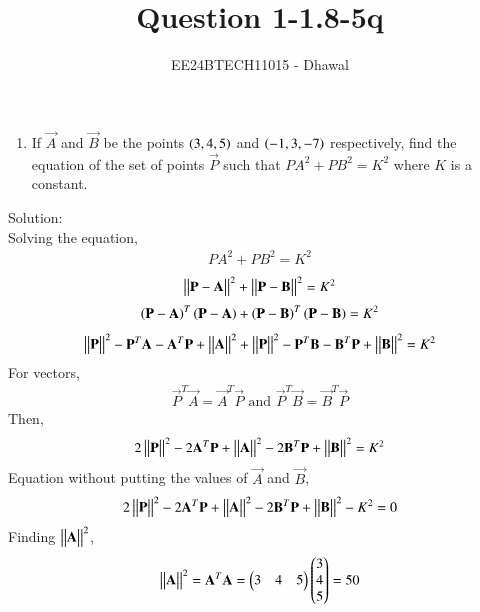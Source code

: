 \documentclass[journal]{IEEEtran}
\numberwithin{equation}{enumi}
\numberwithin{figure}{enumi}
\begin{document}

\title{Question 1-1.8-5q}
\author{EE24BTECH11015 - Dhawal}
{\let\newpage\relax\maketitle}
\begin{enumerate}
	\item If $\vec{A}$ and $\vec{B}$ be the points $\left(3,4,5\right)$ and $\left(-1,3,-7\right)$ respectively, find the equation of the set of points $\vec{P}$ such that ${PA}^2+{PB}^2=K^2$ where $K$ is a constant.
\end{enumerate}
Solution:\\
Solving the equation,
\begin{align}
        {PA}^2+{PB}^2=K^2
        \end{align}
        \begin{align}
        \begin{vmatrix}\begin{vmatrix}\mathbf{P}-\mathbf{A}\end{vmatrix}\end{vmatrix}^2+\begin{vmatrix}\begin{vmatrix}\mathbf{P}-\mathbf{B}\end{vmatrix}\end{vmatrix}^2=K^2
        \end{align}
        \begin{align}
        \left(\mathbf{P}-\mathbf{A}\right)^{T} \left(\mathbf{P}-\mathbf{A}\right)+\left(\mathbf{P}-\mathbf{B}\right)^{T}\left(\mathbf{P}-\mathbf{B}\right)=K^2
        \end{align}
        \begin{align}
        \begin{vmatrix}\begin{vmatrix}\mathbf{P}\end{vmatrix}\end{vmatrix}^2 -\mathbf{P}^{T}\mathbf{A}-\mathbf{A}^{T}\mathbf{P}+\begin{vmatrix}\begin{vmatrix}\mathbf{A}\end{vmatrix}\end{vmatrix}^2 +\begin{vmatrix}\begin{vmatrix}\mathbf{P}\end{vmatrix}\end{vmatrix}^2 -\mathbf{P}^{T}\mathbf{B}-\mathbf{B}^{T}\mathbf{P}+\begin{vmatrix}\begin{vmatrix}\mathbf{B}\end{vmatrix}\end{vmatrix}^2 =K^2
\end{align}
For vectors,
\begin{align}
	\vec{P}^{T}\vec{A}=\vec{A}^{T}\vec{P} \text{ and } \vec{P}^{T}\vec{B}=\vec{B}^{T}\vec{P}
\end{align}
Then,
\begin{align}
	2\begin{vmatrix}\begin{vmatrix}\mathbf{P}\end{vmatrix}\end{vmatrix}^2  -2\mathbf{A}^{T}\mathbf{P}+\begin{vmatrix}\begin{vmatrix}\mathbf{A}\end{vmatrix}\end{vmatrix}^2 -2\mathbf{B}^{T}\mathbf{P}+\begin{vmatrix}\begin{vmatrix}\mathbf{B}\end{vmatrix}\end{vmatrix}^2 =K^2
\end{align}
Equation without putting the values of $\vec{A}$ and $\vec{B}$,
\begin{align}
	2\begin{vmatrix}\begin{vmatrix}\mathbf{P}\end{vmatrix}\end{vmatrix}^2  -2\mathbf{A}^{T}\mathbf{P}+\begin{vmatrix}\begin{vmatrix}\mathbf{A}\end{vmatrix}\end{vmatrix}^2 -2\mathbf{B}^{T}\mathbf{P}+\begin{vmatrix}\begin{vmatrix}\mathbf{B}\end{vmatrix}\end{vmatrix}^2 -K^2=0
\end{align}
Finding $\begin{vmatrix}\begin{vmatrix}\mathbf{A}\end{vmatrix}\end{vmatrix}^2$,
\begin{align}
\begin{vmatrix}\begin{vmatrix}\mathbf{A}\end{vmatrix}\end{vmatrix}^2=\mathbf{A}^T\mathbf{A}=\begin{pmatrix}3&4&5\end{pmatrix}\begin{pmatrix}3\\4\\5\end{pmatrix}=50
\end{align}
\end{document}
